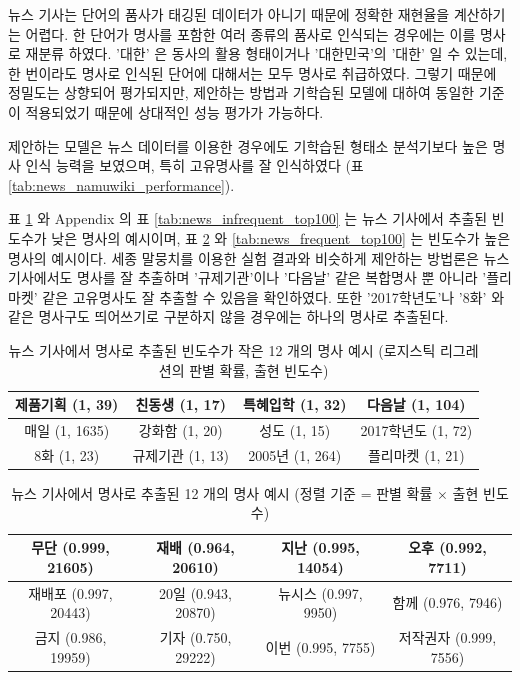 \documentclass[11pt]{article}
\begin{document}
뉴스 기사는 단어의 품사가 태깅된 데이터가 아니기 때문에 정확한 재현율을 계산하기는 어렵다.
한 단어가 명사를 포함한 여러 종류의 품사로 인식되는 경우에는 이를 명사로 재분류 하였다.
'대한' 은 동사의 활용 형태이거나 '대한민국'의 '대한' 일 수 있는데, 한 번이라도 명사로 인식된 단어에 대해서는 모두 명사로 취급하였다.
그렇기 때문에 정밀도는 상향되어 평가되지만, 제안하는 방법과 기학습된 모델에 대하여 동일한 기준이 적용되었기 때문에 상대적인 성능 평가가 가능하다.

제안하는 모델은 뉴스 데이터를 이용한 경우에도  기학습된 형태소 분석기보다 높은 명사 인식 능력을 보였으며, 특히 고유명사를 잘 인식하였다 (표 \ref{tab:news_namuwiki_performance}).

표 \ref{tab:news_infrequent} 와 Appendix 의 표 \ref{tab:news_infrequent_top100} 는 뉴스 기사에서 추출된 빈도수가 낮은 명사의 예시이며, 표 \ref{tab:news_frequent} 와 \ref{tab:news_frequent_top100} 는 빈도수가 높은 명사의 예시이다.
세종 말뭉치를 이용한 실험 결과와 비슷하게 제안하는 방법론은 뉴스 기사에서도 명사를 잘 추출하며 '규제기관'이나 '다음날' 같은 복합명사 뿐 아니라 '플리마켓' 같은 고유명사도 잘 추출할 수 있음을 확인하였다.
또한 '2017학년도'나 '8화' 와 같은 명사구도 띄어쓰기로 구분하지 않을 경우에는 하나의 명사로 추출된다.

\begin{table}[ht]
\centering
\caption{뉴스 기사에서 명사로 추출된 빈도수가 작은 12 개의 명사 예시 (로지스틱 리그레션의 판별 확률, 출현 빈도수)}
\label{tab:news_infrequent}
\begin{tabular}{|c|c|c|c|}
\hline
제품기획 (1, 39) & 친동생 (1, 17) & 특혜입학 (1, 32) & 다음날 (1, 104) \\ \hline
매일 (1, 1635) & 강화함 (1, 20) & 성도 (1, 15) & 2017학년도 (1, 72) \\ \hline
8화 (1, 23) & 규제기관 (1, 13) & 2005년 (1, 264) & 플리마켓 (1, 21) \\ \hline
\end{tabular}%
\end{table}

\begin{table}[ht]
\centering
\caption{뉴스 기사에서 명사로 추출된 12 개의 명사 예시 (정렬 기준 = 판별 확률 $\times$ 출현 빈도수)}
\label{tab:news_frequent}
\begin{tabular}{|c|c|c|c|}
\hline
무단 (0.999, 21605) & 재배 (0.964, 20610) & 지난 (0.995, 14054) & 오후 (0.992, 7711) \\ \hline
재배포 (0.997, 20443) & 20일 (0.943, 20870) & 뉴시스 (0.997, 9950) & 함께 (0.976, 7946) \\ \hline
금지 (0.986, 19959) & 기자 (0.750, 29222) & 이번 (0.995, 7755) & 저작권자 (0.999, 7556) \\ \hline
\end{tabular}%
\end{table}
\end{document}
